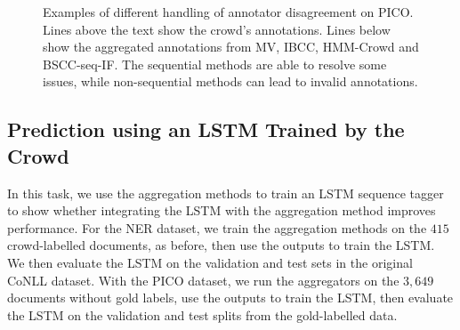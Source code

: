 \begin{figure}
{}
\caption{Examples of different handling of annotator disagreement on PICO. 
Lines above the text show the crowd's annotations. Lines below show the aggregated annotations from MV, IBCC, HMM-Crowd and BSCC-seq-IF.
The sequential methods are able to resolve some issues, 
while non-sequential methods can lead to invalid annotations. }
\label{fig:disagreements}
\end{figure}

\subsection{Prediction using an LSTM Trained by the Crowd}\label{sec:task2}

In this task, we use the aggregation methods to train an LSTM sequence tagger \cite{lample2016}
to show whether integrating the LSTM with the aggregation method improves performance.
For the NER dataset, we train the aggregation methods on the $415$ crowd-labelled documents, as before,
then use the outputs to train the LSTM. We then evaluate the LSTM on the validation and test sets
in the original CoNLL dataset.
With the PICO dataset, we run the aggregators on the $3,649$ documents without gold labels, 
use the outputs to train the LSTM, then evaluate the LSTM on the validation and test splits from the gold-labelled data.


